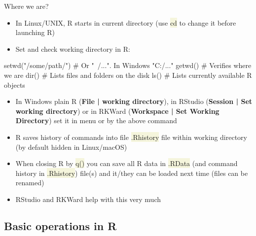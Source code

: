 \documentclass[compress, ucs, xelatex, 11pt, xcolor=svgnames, aspectratio=169,
	hyperref={
		bookmarks=true,
		unicode=true,
		colorlinks=true,
		pdftitle={Molecular data in R},
		plainpages=false,
		pdfauthor={Vojtech Zeisek},
		pdfsubject={Course about phylogeny and evolution in R},
		pdfcreator={XeLaTeX},
		pdfkeywords={R, evolution, phylogeny, molecular data},
		linkcolor=Crimson, %
		anchorcolor=Magenta, %
		citecolor=Magenta, %
		filecolor=Magenta, %
		menucolor=Magenta, %
		urlcolor=DodgerBlue, %
		pdftex},
	url={hyphens, lowtilde} %
	]{beamer}
\renewcommand{\texttt}[1]{\colorbox{Beige}{{\ttfamily #1}}}
\begin{document}
\begin{frame}[fragile]{Where we are?}
	\begin{itemize}
		\item In Linux/UNIX, R starts in current directory (use \texttt{cd} to change it before launching R)
		\item \alert{Set and check working directory} in R:
	\end{itemize}
	\begin{spluscode}
    setwd("/some/path/") # Or "~/...". In Windows "C:/..."
    getwd() # Verifies where we are
    dir() # Lists files and folders on the disk
    ls() # Lists currently available R objects
	\end{spluscode}
	\begin{itemize}
		\item In Windows plain R (\textbf{File | working directory}), in RStudio (\textbf{Session | Set working directory}) or in RKWard (\textbf{Workspace | Set Working Directory}) set it in menu or by the above command
		\item R saves history of commands into file \texttt{.Rhistory} file within working directory (by default hidden in Linux/macOS)
		\item When closing R by \texttt{q()} you can save all R data in \texttt{.RData} (and command history in \texttt{.Rhistory}) file(s) and it/they can be loaded next time (files can be renamed)
		\item RStudio and RKWard help with this very much
	\end{itemize}
\end{frame}

\subsection{Basic operations in R}
\end{document}
